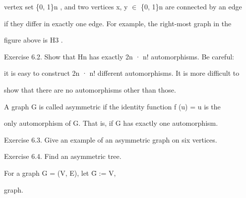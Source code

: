 \documentclass[a4paper,portrait,12pt]{article}
\begin{document}
\begin{flushleft}
vertex set \{0, 1\}n , and two vertices x, y $\in$ \{0, 1\}n are connected by an edge
\end{flushleft}


\begin{flushleft}
if they differ in exactly one edge. For example, the right-most graph in the
\end{flushleft}


\begin{flushleft}
figure above is H3 .
\end{flushleft}


\begin{flushleft}
Exercise 6.2. Show that Hn has exactly 2n · n! automorphisms. Be careful:
\end{flushleft}


\begin{flushleft}
it is easy to construct 2n · n! different automorphisms. It is more difficult to
\end{flushleft}


\begin{flushleft}
show that there are no automorphisms other than those.
\end{flushleft}


\begin{flushleft}
A graph G is called asymmetric if the identity function f (u) = u is the
\end{flushleft}


\begin{flushleft}
only automorphism of G. That is, if G has exactly one automorphism.
\end{flushleft}


\begin{flushleft}
Exercise 6.3. Give an example of an asymmetric graph on six vertices.
\end{flushleft}


\begin{flushleft}
Exercise 6.4. Find an asymmetric tree.
\end{flushleft}


\begin{flushleft}
For a graph G = (V, E), let Ḡ := V,
\end{flushleft}


\begin{flushleft}
graph.
\end{flushleft}
\end{document}
